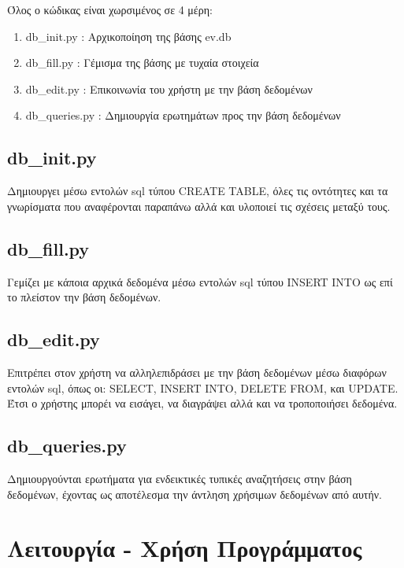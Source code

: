 \documentclass[manuscript,screen,review]{acmart}
\newcommand{\en}[1]{\foreignlanguage{english}{#1}}
\begin{document}
Όλος ο κώδικας είναι χωρσιμένος σε 4 μέρη:

\begin{enumerate}
	\item \en{db\_init.py} : Αρχικοποίηση της βάσης \en{ev.db}
	\item \en{db\_fill.py} : Γέμισμα της βάσης με τυχαία στοιχεία
	\item \en{db\_edit.py} : Επικοινωνία του χρήστη με την βάση δεδομένων
	\item \en{db\_queries.py} : Δημιουργία ερωτημάτων προς την βάση δεδομένων
\end{enumerate}

\subsection{\en{db\_init.py}}

Δημιουργει μέσω εντολών \en{sql} τύπου \en{CREATE TABLE}, όλες τις οντότητες και τα γνωρίσματα 
που αναφέρονται παραπάνω αλλά και υλοποιεί τις σχέσεις μεταξύ τους.

\subsection{\en{db\_fill.py}}

Γεμίζει με κάποια αρχικά δεδομένα μέσω εντολών \en{sql} τύπου \en{INSERT INTO} ως επί το πλείστον
την βάση δεδομένων.

\subsection{\en{db\_edit.py}}

Επιτρέπει στον χρήστη να αλληλεπιδράσει με την βάση δεδομένων μέσω διαφόρων εντολών \en{sql}, όπως
οι: \en{SELECT}, \en{INSERT INTO}, \en{DELETE FROM}, και \en{UPDATE}. Έτσι ο χρήστης μπορέι να εισάγει, 
να διαγράψει αλλά και να τροποποιήσει δεδομένα.

\subsection{\en{db\_queries.py}}

Δημιουργούνται ερωτήματα για ενδεικτικές τυπικές αναζητήσεις στην βάση δεδομένων, έχοντας ως 
αποτέλεσμα την άντληση χρήσιμων δεδομένων από αυτήν.

\section{Λειτουργία - Χρήση Προγράμματος}
\end{document}
